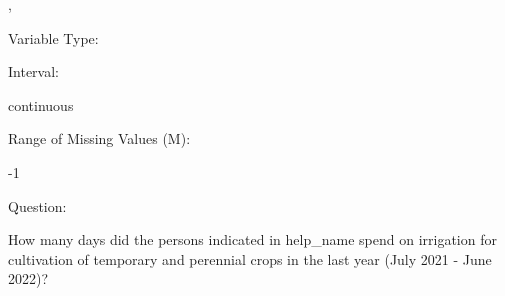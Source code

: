 \documentclass[
]{article}
\begin{document}
,

\begin{minipage}[t]{0.3\linewidth}

\colorbox{mypink1}{}

\end{minipage}%
\begin{minipage}[t]{0.7\linewidth}

\colorbox{mypink1}{\makebox[\textwidth]{\strut\bfseries\color{black}  
 }}

\end{minipage}

\begin{minipage}[t]{0.3\linewidth}

Variable Type:

\end{minipage}%
\begin{minipage}[t]{0.7\linewidth}

\end{minipage}

\begin{minipage}[t]{0.3\linewidth}

Interval:

\end{minipage}%
\begin{minipage}[t]{0.7\linewidth}

continuous

\end{minipage}

\begin{minipage}[t]{0.3\linewidth}

Range of Missing Values (M):

\end{minipage}%
\begin{minipage}[t]{0.7\linewidth}

-1

\end{minipage}

\begin{minipage}[t]{0.3\linewidth}

Question:

\end{minipage}%
\begin{minipage}[t]{0.7\linewidth}

How many days did the persons indicated in help\_name spend on
irrigation for cultivation of temporary and perennial crops in the last
year (July 2021 - June 2022)?

\end{minipage}
\end{document}
